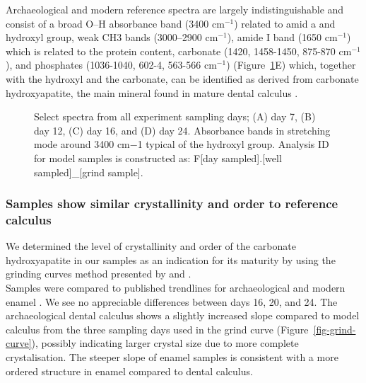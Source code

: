 \documentclass[10pt,a4paper]{article}
\begin{document}
Archaeological and modern reference spectra are largely
indistinguishable and consist of a broad O--H absorbance band (3400
cm\(^{-1}\)) related to amid a and hydroxyl group, weak CH3 bands
(3000--2900 cm\(^{-1}\)), amide I band (1650 cm\(^{-1}\)) which is
related to the protein content, carbonate (1420, 1458-1450, 875-870
cm\(^{-1}\)), and phosphates (1036-1040, 602-4, 563-566 cm\(^{-1}\))
(Figure~\ref{fig-ftir-spectra}E) which, together with the hydroxyl and
the carbonate, can be identified as derived from carbonate
hydroxyapatite, the main mineral found in mature dental calculus
\citep{hayashizakiSiteSpecific2008, jinSupragingivalCalculus2002}.

\begin{figure}


\caption{\label{fig-ftir-spectra}Select spectra from all experiment
sampling days; (A) day 7, (B) day 12, (C) day 16, and (D) day 24.
Absorbance bands in stretching mode around 3400 cm−1 typical of the
hydroxyl group. Analysis ID for model samples is constructed as: F{[}day
sampled{]}.{[}well sampled{]}\_{[}grind sample{]}.}

\end{figure}%

\subsubsection{Samples show similar crystallinity and order to reference
calculus}\label{samples-show-similar-crystallinity-and-order-to-reference-calculus}

We determined the level of crystallinity and order of the carbonate
hydroxyapatite in our samples as an indication for its maturity by using
the grinding curves method presented by
\citet{asscherAtomicDisorder2011} and
\citet{asscherVariationsAtomic2011}.\\
Samples were compared to published trendlines for archaeological and
modern enamel \citep{asscherAtomicDisorder2011}. We see no appreciable
differences between days 16, 20, and 24. The archaeological dental
calculus shows a slightly increased slope compared to model calculus
from the three sampling days used in the grind curve
(Figure~\ref{fig-grind-curve}), possibly indicating larger crystal size
due to more complete crystalisation. The steeper slope of enamel samples
is consistent with a more ordered structure in enamel compared to dental
calculus.
\end{document}
